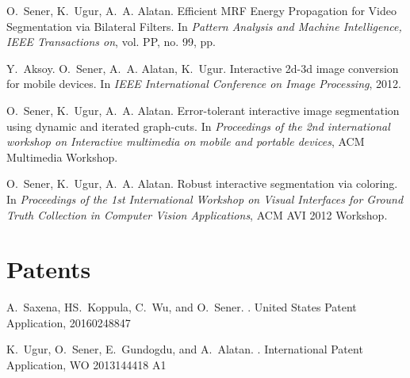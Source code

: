 O.~Sener, K.~Ugur, A.~A. Alatan.
\newblock Efficient MRF Energy Propagation for Video Segmentation via Bilateral Filters.
\newblock In {\em Pattern Analysis and Machine Intelligence, IEEE Transactions on}, vol. PP, no. 99, pp.


Y.~Aksoy. O.~Sener, A.~A. Alatan, K.~Ugur.
\newblock Interactive 2d-3d image conversion for mobile devices.
\newblock In {\em IEEE International Conference on Image Processing}, 2012.
\vspace{-2mm}

	O.~Sener, K.~Ugur, A.~A. Alatan.
	\newblock Error-tolerant interactive image segmentation using dynamic and iterated graph-cuts.
	\newblock In {\em Proceedings of the 2nd international workshop on Interactive multimedia on mobile and portable devices}, ACM Multimedia Workshop.

    O.~Sener, K.~Ugur, A.~A. Alatan.
	\newblock Robust interactive segmentation via coloring.
	\newblock In {\em Proceedings of the 1st International Workshop on Visual
  	Interfaces for Ground Truth Collection in Computer Vision Applications},
  	ACM AVI 2012 Workshop.

    \section{\mysidestyle \textcolor{olgray}{Patents}}
	A.~Saxena, HS.~Koppula, C.~Wu, and O.~Sener.
	.
	\newblock United States Patent Application, 20160248847
	\vspace{-2mm}
	
		K.~Ugur, O.~Sener, E.~Gundogdu, and A.~Alatan.
	.
	\newblock International Patent Application, WO 2013144418 A1
	\vspace{-2mm}
